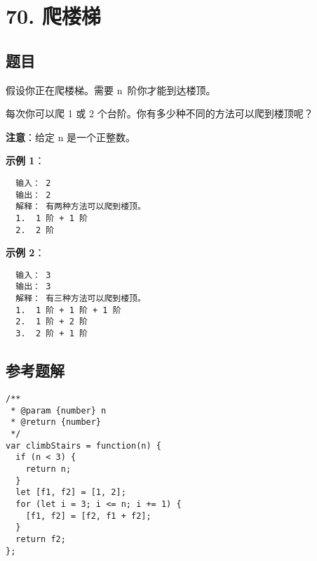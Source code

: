 \newpage
\section{70. 爬楼梯}
\label{leetcode:70}

\subsection{题目}

假设你正在爬楼梯。需要 n 阶你才能到达楼顶。

每次你可以爬 1 或 2 个台阶。你有多少种不同的方法可以爬到楼顶呢？

\textbf{注意}：给定 n 是一个正整数。

\textbf{示例 1}：

\begin{verbatim}
  输入： 2
  输出： 2
  解释： 有两种方法可以爬到楼顶。
  1.  1 阶 + 1 阶
  2.  2 阶
\end{verbatim}

\textbf{示例 2}：

\begin{verbatim}
  输入： 3
  输出： 3
  解释： 有三种方法可以爬到楼顶。
  1.  1 阶 + 1 阶 + 1 阶
  2.  1 阶 + 2 阶
  3.  2 阶 + 1 阶
\end{verbatim}

\subsection{参考题解}

\begin{verbatim}
/**
 * @param {number} n
 * @return {number}
 */
var climbStairs = function(n) {
  if (n < 3) {
    return n;
  }
  let [f1, f2] = [1, 2];
  for (let i = 3; i <= n; i += 1) {
    [f1, f2] = [f2, f1 + f2];
  }
  return f2;
};
\end{verbatim}
